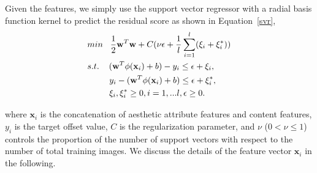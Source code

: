 Given the features, we simply use the support vector regressor with a radial basis function kernel to predict the residual score as shown in Equation~\ref{svr},
\begin{equation}
\begin{split}
& {min} \hspace{0.3cm}\frac{1}{2} \textbf{w}^T \textbf{w}+C(\nu\epsilon  + \frac{1}{l}\sum_{i=1}^{l}(\xi_{i}+\xi_{i}^{*} ) )\\
& s.t. \hspace{0.4cm}  (\textbf{w}^T\phi(\textbf{x}_i) + b) - y_i\leq \epsilon  + \xi _{i},\\
& \hspace{0.9cm}   y_i - (\textbf{w}^T\phi(\textbf{x}_i) + b) \leq \epsilon  + \xi _{i}^{*},\\
&\hspace{0.9cm}   \xi_{i},\xi _{i}^{*}\geq 0, i=1,...l,  \epsilon \geq 0.
\end{split}
\label{svr}
\end{equation}
\vspace{-0.1in}

where $\textbf{x}_i$ is the concatenation of aesthetic attribute features and content features, $y_i$ is the target offset value, $C$ is the regularization parameter, and $\nu$ ($0 < \nu \leq 1$) controls the proportion of the number of support vectors with respect to the number of total training images. We discuss the details of the feature vector $\textbf{x}_i$ in the following.


